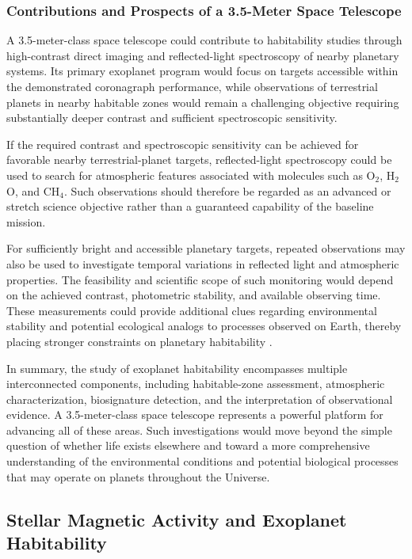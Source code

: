 \subsubsection{Contributions and Prospects of a 3.5-Meter Space Telescope}
A 3.5-meter-class space telescope could contribute to habitability studies through high-contrast direct imaging and reflected-light spectroscopy of nearby planetary systems. Its primary exoplanet program would focus on targets accessible within the demonstrated coronagraph performance, while observations of terrestrial planets in nearby habitable zones would remain a challenging objective requiring substantially deeper contrast and sufficient spectroscopic sensitivity.

If the required contrast and spectroscopic sensitivity can be achieved for favorable nearby terrestrial-planet targets, reflected-light spectroscopy could be used to search for atmospheric features associated with molecules such as O$_2$, H$_2$O, and CH$_4$. Such observations should therefore be regarded as an advanced or stretch science objective rather than a guaranteed capability of the baseline mission.

For sufficiently bright and accessible planetary targets, repeated observations may also be used to investigate temporal variations in reflected light and atmospheric properties. The feasibility and scientific scope of such monitoring would depend on the achieved contrast, photometric stability, and available observing time.
These measurements could provide additional clues regarding environmental stability and potential ecological analogs to processes observed on Earth, thereby placing stronger constraints on planetary habitability \cite{robinson2018}.

In summary, the study of exoplanet habitability encompasses multiple interconnected components, including habitable-zone assessment, atmospheric characterization, biosignature detection, and the interpretation of observational evidence. A 3.5-meter-class space telescope represents a powerful platform for advancing all of these areas. Such investigations would move beyond the simple question of whether life exists elsewhere and toward a more comprehensive understanding of the environmental conditions and potential biological processes that may operate on planets throughout the Universe.

\subsection{Stellar Magnetic Activity and Exoplanet Habitability}\label{stellar-magnetic-activity-and-exoplanet-habitability}

